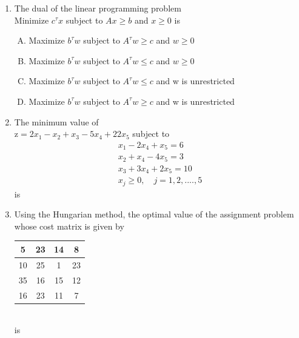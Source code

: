 \documentclass[journal,12pt,twocolumn]{IEEEtran}
\begin{document}
\begin{enumerate}
\item The dual of the linear programming problem \\
Minimize $c^{\tau}x$ subject to $Ax \! \geqslant \! b$ and $x \! \geqslant \! 0$ is 
\begin{enumerate}[(A)]
\setlength\itemsep{1em}
\item Maximize $b^{\tau}w$ subject to $A^{\tau}w \! \geqslant \! c$ and $w \! \geqslant \! 0$
\item Maximize $b^{\tau}w$ subject to $A^{\tau}w \! \leqslant \! c$ and $w \! \geqslant \! 0$
\item Maximize $b^{\tau}w$ subject to $A^{\tau}w \! \leqslant \! c$ and w is unrestricted
\item Maximize $b^{\tau}w$ subject to $A^{\tau}w \! \geqslant \! c$ and w is unrestricted
\end{enumerate}

\item The minimum value of \\
$\text{z} \! = \! 2x_1 \! - \! x_2 \! + \! x_3 \! - \! 5x_4 \! + \! 22x_5$ subject to 
\begin{align*}
x_1 \! - \! 2x_4 \! + \! x_5 \! = \! 6 \\
x_2 \! + \! x_4 \! - \! 4x_5 \! = \! 3 \\
x_3 \! + \! 3x_4 \! + \! 2x_5 \! = \! 10 \\
x_j \! \geqslant \! 0, \quad j=1,2,....,5 
\end{align*} 
is 
\begin{enumerate}[(A)]
\end{enumerate}

\item Using the Hungarian method, the optimal value of the assignment problem whose cost matrix is given by \\
\medskip
\begin{tabular}{|c|c|c|c|} \hline
5 & 23 & 14 & 8 \\ \hline
10 & 25 & 1 & 23 \\ \hline
35 & 16 & 15 & 12 \\ \hline
16 & 23 & 11 & 7 \\ \hline
\end{tabular}
\\
\medskip
is
\begin{enumerate}[(A)]
\end{enumerate}


\end{enumerate}
\end{document}

